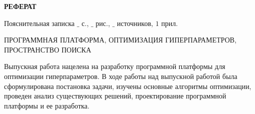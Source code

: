 \begin{center}
	\textbf{РЕФЕРАТ}
\end{center}

Пояснительная записка $\_$ с., $\_$ рис., $\_$ источников, $1$ прил.

ПРОГРАММНАЯ ПЛАТФОРМА, ОПТИМИЗАЦИЯ ГИПЕРПАРАМЕТРОВ, ПРОСТРАНСТВО ПОИСКА

Выпускная работа нацелена на разработку программной платформы для оптимизации гиперпараметров. В ходе работы над выпускной работой была сформулирована постановка задачи, изучены основные алгоритмы оптимизации, проведен анализ существующих решений, проектирование программной платформы и ее разработка.


\clearpage